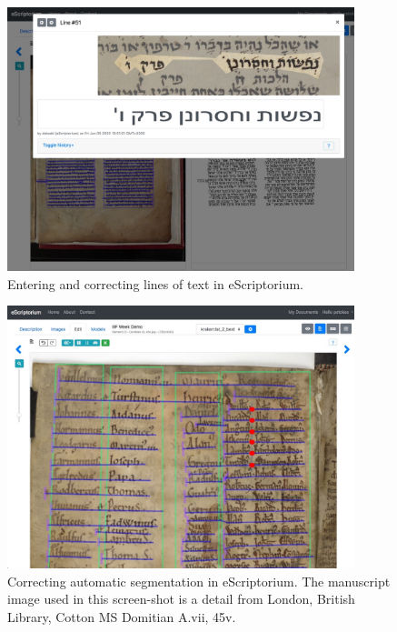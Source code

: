 \begin{figure}[h]
	\centering
	\includegraphics[width=0.9\textwidth]{fig1.jpg}
	\caption{Entering and correcting lines of text in eScriptorium.}
	\label{fig:fig1}
\end{figure}

\begin{figure}[h]
	\centering
	\includegraphics[width=0.9\textwidth]{fig2.jpg}
	\caption{Correcting automatic segmentation in eScriptorium. The
	manuscript image used in this screen-shot is a detail from London,
	British Library, Cotton MS Domitian A.vii, 45v. }
	\label{fig:fig2}
\end{figure}

